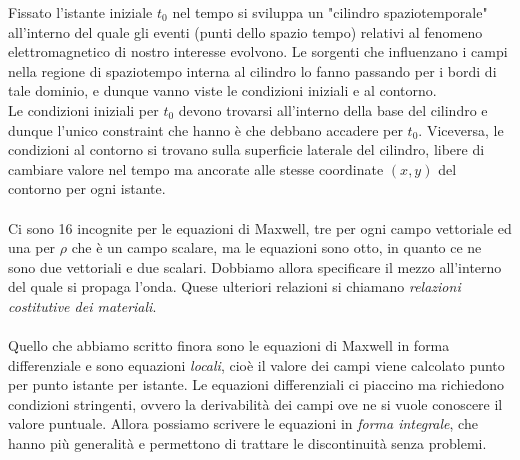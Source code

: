 \documentclass{book}
\begin{document}
        Fissato l'istante iniziale $t_{0}$ nel tempo si sviluppa un "cilindro spaziotemporale" all'interno del quale gli eventi (punti dello spazio tempo) relativi al fenomeno elettromagnetico di nostro interesse evolvono. Le sorgenti che influenzano i campi nella regione di spaziotempo interna al cilindro lo fanno passando per i bordi di tale dominio, e dunque vanno viste le condizioni iniziali e al contorno. \\ Le condizioni iniziali per $t_{0}$ devono trovarsi all'interno della base del cilindro e dunque l'unico constraint che hanno è che debbano accadere per $t_{0}$. Viceversa, le condizioni al contorno si trovano sulla superficie laterale del cilindro, libere di cambiare valore nel tempo ma ancorate alle stesse coordinate $(x,y)$ del contorno per ogni istante.\\ \\
        Ci sono 16 incognite per le equazioni di Maxwell, tre per ogni campo vettoriale ed una per $\rho$ che è un campo scalare, ma le equazioni sono otto, in quanto ce ne sono due vettoriali e due scalari. Dobbiamo allora specificare il mezzo all'interno del quale si propaga l'onda. Quese ulteriori relazioni si chiamano \textit{relazioni costitutive dei materiali}. \\ \\
        Quello che abbiamo scritto finora sono le equazioni di Maxwell in forma differenziale e sono equazioni \textit{locali}, cioè il valore dei campi viene calcolato punto per punto istante per istante. Le equazioni differenziali ci piaccino ma richiedono condizioni stringenti, ovvero la derivabilità dei campi ove ne si vuole conoscere il valore puntuale. Allora possiamo scrivere le equazioni in \textit{forma integrale}, che hanno più generalità e permettono di trattare le discontinuità senza problemi. 
\end{document}
